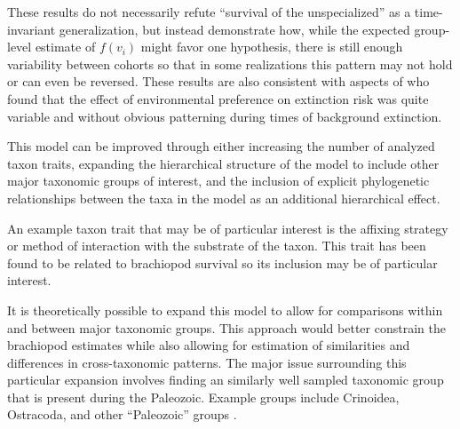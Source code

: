 \documentclass[12pt,letterpaper]{article}
\begin{document}
These results do not necessarily refute ``survival of the unspecialized'' as a time-invariant generalization, but instead demonstrate how, while the expected group-level estimate of \(f(v_{i})\) might favor one hypothesis, there is still enough variability between cohorts so that in some realizations this pattern may not hold or can even be reversed. These results are also consistent with aspects of \citet{Miller2009a} who found that the effect of environmental preference on extinction risk was quite variable and without obvious patterning during times of background extinction.


This model can be improved through either increasing the number of analyzed taxon traits, expanding the hierarchical structure of the model to include other major taxonomic groups of interest, and the inclusion of explicit phylogenetic relationships between the taxa in the model as an additional hierarchical effect.

An example taxon trait that may be of particular interest is the affixing strategy or method of interaction with the substrate of the taxon. This trait has been found to be related to brachiopod survival \citep{Alexander1977} so its inclusion may be of particular interest.

It is theoretically possible to expand this model to allow for comparisons within and between major taxonomic groups. This approach would better constrain the brachiopod estimates while also allowing for estimation of similarities and differences in cross-taxonomic patterns. The major issue surrounding this particular expansion involves finding an similarly well sampled taxonomic group that is present during the Paleozoic. Example groups include Crinoidea, Ostracoda, and other ``Paleozoic'' groups \citep{SepkoskiJr.1981a}.
\end{document}
